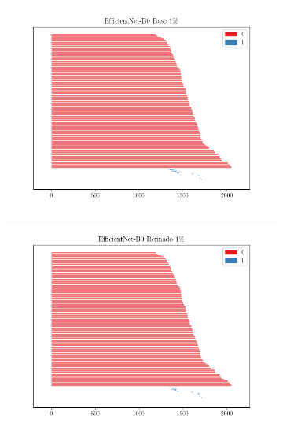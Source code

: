 \begin{figure}[H]
	\centering
	\begin{subfigure}
		{.5\textwidth}
		\centering
		\includegraphics[width=\linewidth]{img/bar_effcientnet_base_0.01.png}
	\end{subfigure}%
	\begin{subfigure}
		{.5\textwidth}
		\centering
		\includegraphics[width=\linewidth]{img/bar_effcientnet_refine_0.01.png}
	\end{subfigure}
	\begin{subfigure}
		{.5\textwidth}
		\centering

\end{subfigure}
\end{figure}
